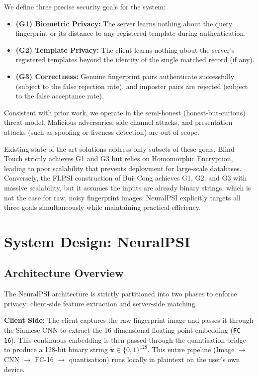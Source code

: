 \documentclass[11pt,a4paper]{article}
\begin{document}
We define three precise security goals for the system:
\begin{itemize}[noitemsep]
    \item \textbf{(G1) Biometric Privacy:} The server learns nothing about the query fingerprint or its distance to any registered template during authentication.
    \item \textbf{(G2) Template Privacy:} The client learns nothing about the server's registered templates beyond the identity of the single matched record (if any).
    \item \textbf{(G3) Correctness:} Genuine fingerprint pairs authenticate successfully (subject to the false rejection rate), and imposter pairs are rejected (subject to the false acceptance rate).
\end{itemize}

Consistent with prior work, we operate in the semi-honest (honest-but-curious) threat model. Malicious adversaries, side-channel attacks, and presentation attacks (such as spoofing or liveness detection) are out of scope.

Existing state-of-the-art solutions address only subsets of these goals. Blind-Touch strictly achieves G1 and G3 but relies on Homomorphic Encryption, leading to poor scalability that prevents deployment for large-scale databases. Conversely, the FLPSI construction of Bui--Cong achieves G1, G2, and G3 with massive scalability, but it assumes the inputs are already binary strings, which is not the case for raw, noisy fingerprint images. NeuralPSI explicitly targets all three goals simultaneously while maintaining practical efficiency.

\section{System Design: NeuralPSI}
\label{sec:design}

\subsection{Architecture Overview}

The NeuralPSI architecture is strictly partitioned into two phases to enforce privacy: client-side feature extraction and server-side matching.

\textbf{Client Side:} The client captures the raw fingerprint image and passes it through the Siamese CNN to extract the 16-dimensional floating-point embedding (\texttt{FC-16}). This continuous embedding is then passed through the quantisation bridge to produce a 128-bit binary string $\tilde{\mathbf{x}} \in \{0,1\}^{128}$. This entire pipeline (Image $\to$ CNN $\to$ FC-16 $\to$ quantisation) runs locally in plaintext on the user's own device.
\end{document}
